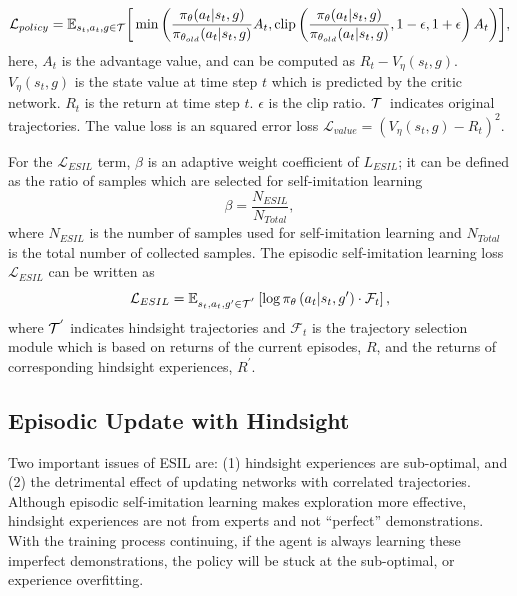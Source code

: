 \begin{equation}
  \centering
  \mathcal{L}_{policy} = \mathbb{E}_{s_{t}, a_{t}, g\in\Tau}\biggr[\min \left (\frac{\pi_{\theta}(a_{t}|s_{t}, g)}{\pi_{\theta_{old}}(a_{t}|s_{t}, g)}A_{t}, \clip \left (\frac{\pi_{\theta}(a_{t}|s_{t}, g)}{\pi_{\theta_{old}}(a_{t}|s_{t}, g)}, 1-\epsilon, 1+\epsilon \right )A_{t}\right )\biggr],
  \label{eq:policy_loss}
\end{equation}
here, $A_{t}$ is the advantage value, and can be computed as $R_{t} - V_{\eta}(s_{t}, g)$. $V_{\eta}(s_{t}, g)$ is the state value at time step $t$ which is predicted by the critic network. $R_{t}$ is the return at time step $t$. $\epsilon$ is the clip ratio. $\mathcal{T}$~indicates original trajectories. {The value loss is an squared error loss $\mathcal{L}_{value}=(V_{\eta}(s_{t}, g) - R_{t})^{2}$.}

For the $\mathcal{L}_{ESIL}$ term, $\beta$ is an adaptive weight coefficient of $L_{ESIL}$; it can be defined as the ratio of samples which are selected for self-imitation learning
\begin{equation}
  \beta=\frac{N_{ESIL}}{N_{Total}},
\end{equation}
where $N_{ESIL}$ is the number of samples used for self-imitation learning and $N_{Total}$ is the total number of collected samples.
The episodic self-imitation learning loss $\mathcal{L}_{ESIL}$ can be written as 
\begin{equation}
  \centering
  \mathcal{L}_{ESIL}=\mathbb{E}_{s_{t}, a_{t}, g^\prime\in\Tau^{'}}\left[\log\pi_{\theta}\left(a_{t}|s_{t}, g^\prime\right)\cdot\mathcal{F}_t\right],
  \label{eq:imitaion}
\end{equation}
where $\mathcal{T}^{'}$ indicates hindsight trajectories and $\mathcal{F}_t$ is the trajectory selection module which is based on returns of the current episodes, $R$, and the returns of corresponding hindsight experiences, $R^{\prime}$.

\subsection{Episodic Update with Hindsight}
Two important issues of ESIL are: (1) hindsight experiences are sub-optimal, and (2) the {detrimental} effect of updating networks with correlated trajectories. Although episodic self-imitation learning makes exploration more effective, hindsight experiences are not from experts and not ``perfect'' demonstrations.  With the training process continuing, if the agent is always learning these imperfect demonstrations, the policy will be stuck at the sub-optimal, or experience overfitting.

